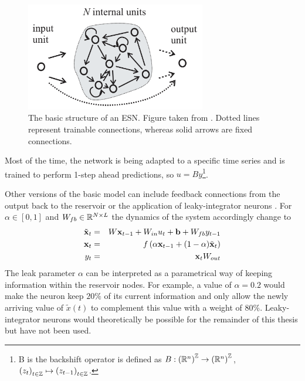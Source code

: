 \begin{figure}
    \begin{center}
    \includegraphics[width=0.7\textwidth]{Pictures/BasicESNStructure.png}
    \end{center}
    \label{FIG:ESNArchitecture}
    \caption{The basic structure of an ESN. Figure taken from \cite{Jaeger2003}. Dotted lines represent trainable connections, whereas solid arrows are fixed connections.}
\end{figure}

Most of the time, the network is being adapted to a specific time series and is trained to perform 1-step ahead predictions, so $u = By$\footnote{B is the backshift operator is defined as $B: \left(\mathbb{R}^n\right)^{\mathbb{Z}} \to \left(\mathbb{R}^n\right)^{\mathbb{Z}}$, $\left(z_t\right)_{t\in\mathbb{Z}} \mapsto \left(z_{t-1}\right)_{t\in\mathbb{Z}}$.}.

Other versions of the basic model can include feedback connections from the output back to the reservoir or the application of leaky-integrator neurons \citep{JAEGER2007335}.
For $\alpha \in \left[0, 1\right]$ and $W_{fb} \in \mathbb{R}^{N\times L}$ the dynamics of the system  accordingly change to
\begin{eqnarray}
    \tilde {{\bf x}}_t & = & W{\bf x}_{t-1} + W_{in} u_t +  {\bf b} + W_{fb} y_{t-1} \label{EQ:UpdateLeakyIntegrator}\\
    {\bf x}_t & = & f\left(\alpha {\bf x}_{t-1} + (1-\alpha) \tilde {{\bf x}}_t \right) \\
    y_t & = & {\bf x}_t W_{out}  \label{EQ:ESNOutput}
\end{eqnarray}
The leak parameter $\alpha$ can be interpreted as a parametrical way of keeping information within the reservoir nodes. For example, a value of $\alpha = 0.2$ would make the neuron keep $20\%$ of its current information and only allow the newly arriving value of $\tilde x(t)$ to complement this value with a weight of $80\%$. Leaky-integrator neurons would theoretically be possible for the remainder of this thesis but have not been used.

